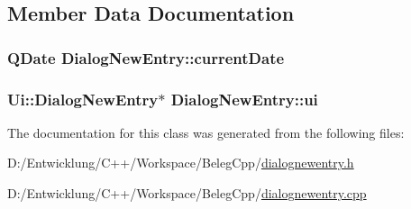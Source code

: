 \subsection{Member Data Documentation}
\hypertarget{class_dialog_new_entry_a2caaaa17bdf2e1ce91cf21a162d32c03}{
\subsubsection[{current\+Date}]{\setlength{\rightskip}{0pt plus 5cm}Q\+Date Dialog\+New\+Entry\+::current\+Date\hspace{0.3cm}{\ttfamily [private]}}}\label{class_dialog_new_entry_a2caaaa17bdf2e1ce91cf21a162d32c03}
\hypertarget{class_dialog_new_entry_a793dbaf0032320cdc11a683fe27c30f0}{
\subsubsection[{ui}]{\setlength{\rightskip}{0pt plus 5cm}Ui\+::\+Dialog\+New\+Entry$\ast$ Dialog\+New\+Entry\+::ui\hspace{0.3cm}{\ttfamily [private]}}}\label{class_dialog_new_entry_a793dbaf0032320cdc11a683fe27c30f0}


The documentation for this class was generated from the following files\+:\begin{DoxyCompactItemize}
\item 
D\+:/\+Entwicklung/\+C++/\+Workspace/\+Beleg\+Cpp/\hyperlink{dialognewentry_8h}{dialognewentry.\+h}\item 
D\+:/\+Entwicklung/\+C++/\+Workspace/\+Beleg\+Cpp/\hyperlink{dialognewentry_8cpp}{dialognewentry.\+cpp}\end{DoxyCompactItemize}
